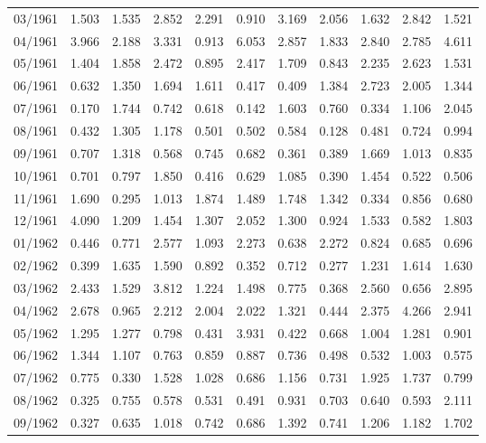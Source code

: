 \begin{tabular}{lrrrrrrrrrr}
03/1961 &  1.503 &  1.535 &  2.852 &  2.291 &  0.910 &  3.169 &  2.056 &  1.632 &  2.842 &  1.521 \\
04/1961 &  3.966 &  2.188 &  3.331 &  0.913 &  6.053 &  2.857 &  1.833 &  2.840 &  2.785 &  4.611 \\
05/1961 &  1.404 &  1.858 &  2.472 &  0.895 &  2.417 &  1.709 &  0.843 &  2.235 &  2.623 &  1.531 \\
06/1961 &  0.632 &  1.350 &  1.694 &  1.611 &  0.417 &  0.409 &  1.384 &  2.723 &  2.005 &  1.344 \\
07/1961 &  0.170 &  1.744 &  0.742 &  0.618 &  0.142 &  1.603 &  0.760 &  0.334 &  1.106 &  2.045 \\
08/1961 &  0.432 &  1.305 &  1.178 &  0.501 &  0.502 &  0.584 &  0.128 &  0.481 &  0.724 &  0.994 \\
09/1961 &  0.707 &  1.318 &  0.568 &  0.745 &  0.682 &  0.361 &  0.389 &  1.669 &  1.013 &  0.835 \\
10/1961 &  0.701 &  0.797 &  1.850 &  0.416 &  0.629 &  1.085 &  0.390 &  1.454 &  0.522 &  0.506 \\
11/1961 &  1.690 &  0.295 &  1.013 &  1.874 &  1.489 &  1.748 &  1.342 &  0.334 &  0.856 &  0.680 \\
12/1961 &  4.090 &  1.209 &  1.454 &  1.307 &  2.052 &  1.300 &  0.924 &  1.533 &  0.582 &  1.803 \\
01/1962 &  0.446 &  0.771 &  2.577 &  1.093 &  2.273 &  0.638 &  2.272 &  0.824 &  0.685 &  0.696 \\
02/1962 &  0.399 &  1.635 &  1.590 &  0.892 &  0.352 &  0.712 &  0.277 &  1.231 &  1.614 &  1.630 \\
03/1962 &  2.433 &  1.529 &  3.812 &  1.224 &  1.498 &  0.775 &  0.368 &  2.560 &  0.656 &  2.895 \\
04/1962 &  2.678 &  0.965 &  2.212 &  2.004 &  2.022 &  1.321 &  0.444 &  2.375 &  4.266 &  2.941 \\
05/1962 &  1.295 &  1.277 &  0.798 &  0.431 &  3.931 &  0.422 &  0.668 &  1.004 &  1.281 &  0.901 \\
06/1962 &  1.344 &  1.107 &  0.763 &  0.859 &  0.887 &  0.736 &  0.498 &  0.532 &  1.003 &  0.575 \\
07/1962 &  0.775 &  0.330 &  1.528 &  1.028 &  0.686 &  1.156 &  0.731 &  1.925 &  1.737 &  0.799 \\
08/1962 &  0.325 &  0.755 &  0.578 &  0.531 &  0.491 &  0.931 &  0.703 &  0.640 &  0.593 &  2.111 \\
09/1962 &  0.327 &  0.635 &  1.018 &  0.742 &  0.686 &  1.392 &  0.741 &  1.206 &  1.182 &  1.702 \\

\end{tabular}
